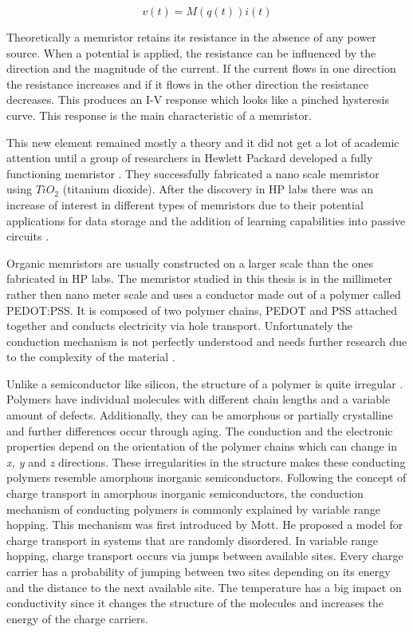 \begin{doublespace}
\begin{equation}
v(t)=M(q(t))i(t)
\end{equation}

Theoretically a memristor retains its resistance in the absence of any power source. When a potential is applied, the resistance can be influenced by the direction and the magnitude of the current. If the current flows in one direction the resistance increases and if it flows in the other direction the resistance decreases. This produces an I-V response which looks like a pinched hysteresis curve. This response is the main characteristic of a memristor. 

This new element remained mostly a theory and it did not get a lot of academic attention until a group of researchers in Hewlett Packard developed a fully functioning memristor \cite{MisMem}. They successfully fabricated a nano scale memristor using $TiO_2$ (titanium dioxide). After the discovery in HP labs there was an increase of interest in different types of memristors due to their potential applications for data storage and the addition of learning capabilities into passive circuits \cite{AdaptiveMem} \cite{Synapse} \cite{CMOS}. 

Organic memristors are usually constructed on a larger scale than the ones fabricated in HP labs. The memristor studied in this thesis is in the millimeter rather then nano meter scale and uses a conductor made out of a polymer called PEDOT:PSS. It is composed of two polymer chains, PEDOT and PSS attached together and conducts electricity via hole transport. Unfortunately the conduction mechanism is not perfectly understood and needs further research due to the complexity of the material \cite{PedotBook}.

Unlike a semiconductor like silicon, the structure of a polymer is quite irregular \cite{PedotBook}. Polymers have individual molecules with different chain lengths and a variable amount of defects. Additionally, they can be amorphous or partially crystalline and further differences occur through aging. The conduction and the electronic properties depend on the orientation of the polymer chains which can change in \textit{x, y} and \textit{z} directions. These irregularities in the structure makes these conducting polymers resemble amorphous inorganic semiconductors. Following the concept of charge transport in amorphous inorganic semiconductors, the conduction mechanism of conducting polymers is commonly explained by variable range hopping. This mechanism was first introduced by Mott\cite{Mott}. He proposed a model for charge transport in systems that are randomly disordered. In variable range hopping, charge transport occurs via jumps between available sites. Every charge carrier has a probability of jumping between two sites depending on its energy and the distance to the next available site. The temperature has a big impact on conductivity since it changes the structure of the molecules and increases the energy of the charge carriers.


\end{doublespace}
